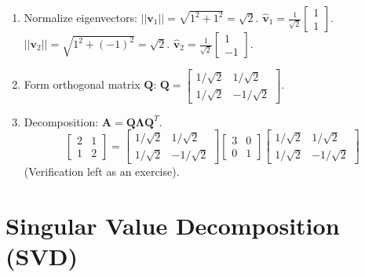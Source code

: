 \documentclass{article}
\newcommand{\vect}[1]{\bm{#1}} %
\newcommand{\mat}[1]{\bm{#1}}  %
\begin{document}
\begin{enumerate}
    \item Normalize eigenvectors: $||\vect{v}_1|| = \sqrt{1^2+1^2} = \sqrt{2}$. $\hat{\vect{v}}_1 = \frac{1}{\sqrt{2}} \begin{bmatrix} 1 \\ 1 \end{bmatrix}$.
    $||\vect{v}_2|| = \sqrt{1^2+(-1)^2} = \sqrt{2}$. $\hat{\vect{v}}_2 = \frac{1}{\sqrt{2}} \begin{bmatrix} 1 \\ -1 \end{bmatrix}$.
    \item Form orthogonal matrix $\mat{Q}$: $\mat{Q} = \begin{bmatrix} 1/\sqrt{2} & 1/\sqrt{2} \\ 1/\sqrt{2} & -1/\sqrt{2} \end{bmatrix}$.
    \item Decomposition: $\mat{A} = \mat{Q}\mat{\Lambda}\mat{Q}^T$.
    \[ \begin{bmatrix} 2 & 1 \\ 1 & 2 \end{bmatrix} = \begin{bmatrix} 1/\sqrt{2} & 1/\sqrt{2} \\ 1/\sqrt{2} & -1/\sqrt{2} \end{bmatrix} \begin{bmatrix} 3 & 0 \\ 0 & 1 \end{bmatrix} \begin{bmatrix} 1/\sqrt{2} & 1/\sqrt{2} \\ 1/\sqrt{2} & -1/\sqrt{2} \end{bmatrix} \]
    (Verification left as an exercise).
\end{enumerate}

\section{Singular Value Decomposition (SVD)}
\end{document}
